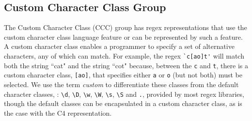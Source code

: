 \subsection{Custom Character Class Group}
The Custom Character Class (CCC) group has regex representations that use the custom character class language feature or can be represented by such a feature.
 A custom character class enables a programmer to specify a set of alternative characters, any of which can match.  For example, the regex \verb!`c[ao]t'! will match both the string ``cat" and the string ``cot" because, between the \verb!c! and \verb!t!, there is a custom character class, \verb![ao]!, that specifies either \verb!a! or \verb!o! (but not both) must be selected.  We use the term \emph{custom} to differentiate these classes  from the default character classes, : \verb!\d!, \verb!\D!, \verb!\w!, \verb!\W!, \verb!\s!, \verb!\S! and \verb!.!,  provided by most regex libraries, though the default classes can be encapsulated in a custom character class, as is the case with the C4 representation.

